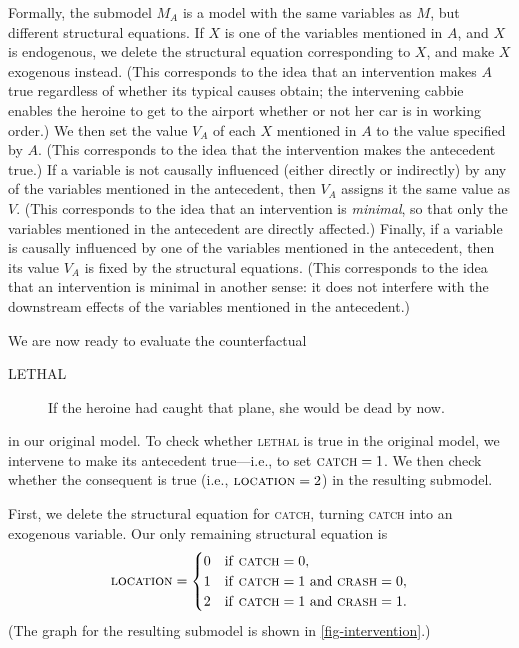 Formally, the submodel $M_A$ is a model with the same variables as $M$, but different structural equations.  If $X$ is one of the variables mentioned in $A$, and $X$ is endogenous, we delete the structural equation corresponding to $X$, and make $X$ exogenous instead.  (This corresponds to the idea that an intervention makes $A$ true regardless of whether its typical causes obtain; the intervening cabbie enables the heroine to get to the airport whether or not her car is in working order.) We then set the value  $V_A$ of each $X$ mentioned in $A$  to the value specified by $A$. (This corresponds to the idea that the intervention makes the antecedent true.)  If a variable is not causally influenced (either directly or indirectly) by any of the variables mentioned in the antecedent, then $V_A$ assigns it the same value as $V$. (This corresponds to the idea that an intervention is \emph{minimal}, so that only the variables mentioned in the antecedent are directly affected.) Finally, if a variable is causally influenced by one of the variables mentioned in the antecedent, then its value $V_A$ is fixed by the structural equations.   (This corresponds to the idea that an intervention is minimal in another sense: it does not interfere with the downstream effects of the variables mentioned in the antecedent.)

We are now ready to evaluate the counterfactual
\begin{description}
\item[LETHAL] If the heroine had caught that plane, she would be dead by now.
\end{description}
in our original model.  To check whether \textsc{lethal} is true in the original model, we intervene to make its antecedent true---i.e., to set $\text{\textsc{catch}} = 1$.  We then check whether the consequent is true (i.e., $\text{\textsc{location}} = 2$) in the resulting submodel.

First, we delete the structural equation for \textsc{catch}, turning  \textsc{catch} into an exogenous variable. Our only remaining structural equation is
$$
\text{\textsc{location}} = 
  \begin{cases}
	0 & \text{if \textsc{catch}} = 0,\\
	1 & \text{if \textsc{catch}} = 1 \text{ and \textsc{crash}} = 0,\\
	2 & \text{if \textsc{catch}} = 1 \text{ and \textsc{crash}} = 1.\\
  \end{cases}
$$
(The graph for the resulting submodel is shown in \autoref{fig-intervention}.)


